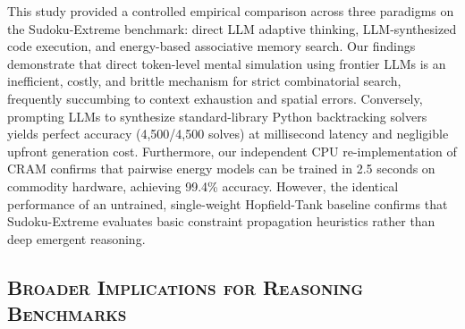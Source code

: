 \documentclass{article} %
\begin{document}
This study provided a controlled empirical comparison across three paradigms on the Sudoku-Extreme benchmark: direct LLM adaptive thinking, LLM-synthesized code execution, and energy-based associative memory search. Our findings demonstrate that direct token-level mental simulation using frontier LLMs is an inefficient, costly, and brittle mechanism for strict combinatorial search, frequently succumbing to context exhaustion and spatial errors. Conversely, prompting LLMs to synthesize standard-library Python backtracking solvers yields perfect accuracy (4,500/4,500 solves) at millisecond latency and negligible upfront generation cost. Furthermore, our independent CPU re-implementation of CRAM confirms that pairwise energy models can be trained in 2.5 seconds on commodity hardware, achieving 99.4\% accuracy. However, the identical performance of an untrained, single-weight Hopfield-Tank baseline confirms that Sudoku-Extreme evaluates basic constraint propagation heuristics rather than deep emergent reasoning.

\subsection{\textsc{Broader Implications for Reasoning Benchmarks}}
\label{subsec:broader_implications}
\end{document}
